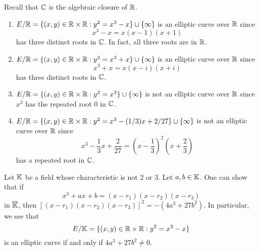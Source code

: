 \begin{exmp}
    Recall that $\mathbb{C}$ is the algebraic closure of $\mathbb{R}$. 
    \begin{enumerate}[(1)]
        \item $E/\mathbb{R} = \{(x, y) \in \mathbb{R} \times \mathbb{R} : y^2 = x^3 - x\} \cup \{\infty\}$
        is an elliptic curve over $\mathbb{R}$ since 
        \[ x^3 - x = x(x-1)(x+1) \] 
        has three distinct roots in $\mathbb{C}$. In fact, all three roots are in $\mathbb{R}$. 
        \item $E/\mathbb{R} = \{(x, y) \in \mathbb{R} \times \mathbb{R} : y^2 = x^3 + x\} \cup \{\infty\}$
        is an elliptic curve over $\mathbb{R}$ since
        \[ x^3 + x = x(x-i)(x+i) \] 
        has three distinct roots in $\mathbb{C}$. 
        \item $E/\mathbb{R} = \{(x, y) \in \mathbb{R} \times \mathbb{R} : y^2 = x^3\} \cup \{\infty\}$
        is not an elliptic curve over $\mathbb{R}$ since $x^3$ has the repeated root 
        $0$ in $\mathbb{C}$. 
        \item $E/\mathbb{R} = \{(x, y) \in \mathbb{R} \times \mathbb{R} : y^2 = x^3 - (1/3)x + 
        2/27\} \cup \{\infty\}$ is not an elliptic curve over $\mathbb{R}$ since 
        \[ x^3 - \frac13x + \frac{2}{27} = \left(x - \frac13\right)^{\!2}\left(x + \frac23\right) \] 
        has a repeated root in $\mathbb{C}$.
    \end{enumerate}
\end{exmp}

\begin{remark}
    Let $\mathbb{K}$ be a field whose characteristic is not $2$ or $3$. Let 
    $a, b \in \mathbb{K}$. One can show that if 
    \[ x^3 + ax + b = (x - r_1)(x - r_2)(x - r_3) \] 
    in $\overline{\mathbb{K}}$, then $[(x - r_1)(x - r_2)(x - r_3)]^2 = -(4a^3 + 27b^2)$. 
    In particular, we see that 
    \[ E/\mathbb{K} = \{(x, y) \in \mathbb{R} \times \mathbb{R} : y^2 = x^3 - x\} \] 
    is an elliptic curve if and only if $4a^3 + 27b^2 \neq 0$. 
\end{remark}
